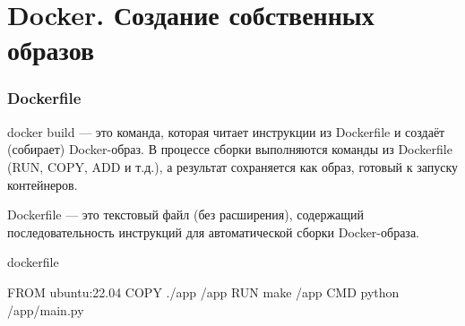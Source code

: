 \documentclass[9pt, aspectratio=1610]{beamer}
\begin{document}
\section[Dockerfile]{Docker. Создание собственных образов}

\begin{frame}
	\tableofcontents
	\sectionpage
\end{frame}





\begin{frame}[fragile=singleslide]\frametitle{Dockerfile}
	

	\begin{alertblock}{docker build ---}
		это команда, которая читает инструкции из Dockerfile и создаёт (собирает) Docker-образ. В процессе сборки выполняются команды из Dockerfile (RUN, COPY, ADD и т.д.), а результат сохраняется как образ, готовый к запуску контейнеров.
	\end{alertblock}
	
	\begin{alertblock}{Dockerfile ---}
		это текстовый файл (без расширения), содержащий последовательность инструкций для автоматической сборки Docker-образа. 
	\end{alertblock}
	
	\begin{block}{dockerfile}
		\begin{dockerfile}
			FROM ubuntu:22.04
			COPY ./app /app
			RUN make /app
			CMD python /app/main.py
		\end{dockerfile}
	\end{block}
	
\end{frame}
\end{document}
